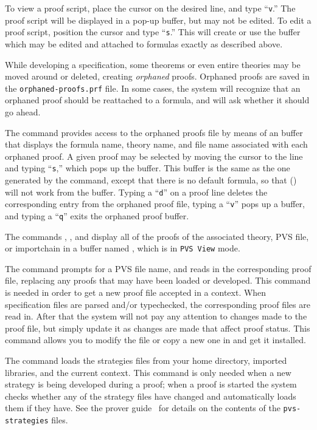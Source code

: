 To view a proof script, place the cursor on the desired line, and type
``\texttt{v}.''  The proof script will be displayed in a pop-up buffer,
but may not be edited.  To edit a proof script, position the cursor and
type ``\texttt{s}.''  This will create or use the  buffer
which may be edited and attached to formulas exactly as described above.

While developing a specification, some theorems or even entire theories
may be moved around or deleted, creating \emph{orphaned}
proofs.  Orphaned proofs are saved in the
\texttt{orphaned-proofs.prf} file.  In some cases,
the system will recognize that an orphaned proof should be reattached to a
formula, and will ask whether it should go ahead.

The  command provides access to the orphaned
proofs file by means of an  buffer that displays the
formula name, theory name, and file name associated with each orphaned
proof.  A given proof may be selected by moving the cursor to the line and
typing ``\texttt{s},'' which pops up the  buffer.  This buffer
is the same as the one generated by the  command, except
that there is no default formula, so that  () will not work from the  buffer.  Typing a ``\texttt{d}''
on a proof line deletes the corresponding entry from the orphaned proof
file, typing a ``\texttt{v}'' pops up a  buffer, and
typing a ``\texttt{q}'' exits the orphaned proof buffer.

The commands , , and
 display all of the proofs of the associated
theory, PVS file, or importchain in a buffer named ,
which is in \texttt{PVS View} mode.

The  command prompts for a PVS file name, and
reads in the corresponding proof file, replacing any proofs that may have
been loaded or developed.  This command is needed in order to get a new
proof file accepted in a context.  When specification files are parsed
and/or typechecked, the corresponding proof files are read in.  After that
the system will not pay any attention to changes made to the proof file,
but simply update it as changes are made that affect proof status.  This
command allows you to modify the file or copy a new one in and get it
installed.

The  command loads the strategies files from your
home directory, imported libraries, and the current context.  This command
is only needed when a new strategy is being developed during a proof; when
a proof is started the system checks whether any of the strategy files
have changed and automatically loads them if they have.  See the prover
guide~\cite{PVS:prover} for details on the contents of the
\texttt{pvs-strategies} files.

